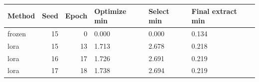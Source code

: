 \begin{tabular}{lrrlll}
\toprule
Method & Seed & Epoch & Optimize min & Select min & Final extract min\\\midrule
frozen & 15 & 0 & 0.000 & 0.000 & 0.134\\
lora & 15 & 13 & 1.713 & 2.678 & 0.218\\
lora & 16 & 17 & 1.726 & 2.691 & 0.219\\
lora & 17 & 18 & 1.738 & 2.694 & 0.219\\
\bottomrule\end{tabular}
